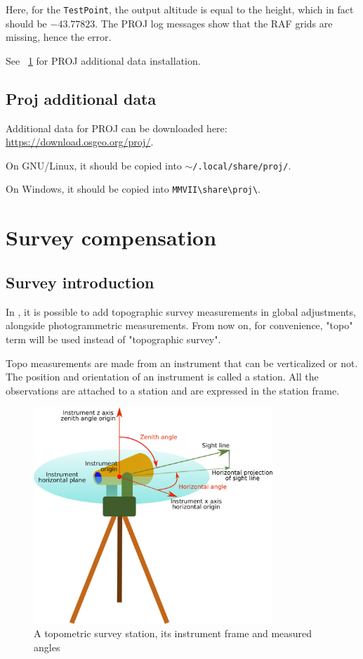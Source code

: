 Here, for the {\tt TestPoint}, the output altitude is equal to the height, which in fact should be $-43.77823$.
The PROJ log messages show that the RAF grids are missing, hence the error.

See ~\ref{ProjData} for PROJ additional data installation.


\section{Proj additional data}
\label{ProjData}
Additional data for PROJ can be downloaded here: \url{https://download.osgeo.org/proj/}.

On GNU/Linux, it should be copied into $\sim${\tt /.local/share/proj/}.

On Windows, it should be copied into {\tt MMVII\textbackslash share\textbackslash proj\textbackslash}.




\chapter{Survey compensation}
\label{Chap:TopoUser}


\section{Survey introduction}

In \CdPPP, it is possible to add topographic survey measurements in global adjustments, alongside photogrammetric measurements. From now on, for convenience, "topo" term will be used instead of "topographic survey".


Topo measurements are made from an instrument that can be verticalized or not.
The position and orientation of an instrument is called a station.
All the observations are attached to a station and are expressed in the station frame.

\begin{figure}[!h]
\centering
\includegraphics[width=9cm]{CommandReferences/ImagesComRef/topo.png}
\caption{A topometric survey station, its instrument frame and measured angles}
\label{fig:topoStation}
\end{figure}

